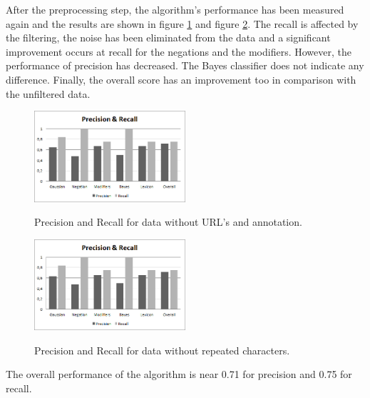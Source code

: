 After the preprocessing step, the algorithm's performance has been measured again and the results are shown in figure \ref{nonannotateddata} and figure \ref{nonmultiplesdata}. The recall is affected by the filtering, the noise has been eliminated from the data and a significant improvement occurs at recall for the negations and the modifiers. However, the performance of precision has decreased. The Bayes classifier does not indicate any difference.  Finally, the overall score has an improvement too in comparison with the unfiltered data.  
\begin{figure}[ht]
\centering
\includegraphics[width=0.5\textwidth]{images/nonannotadeddata.png}
\label{nonannotateddata}
\caption{Precision and Recall for data without URL's and annotation.}
\end{figure}

\begin{figure}[ht]
\centering
\includegraphics[width=0.5\textwidth]{images/eliminatedmultiplesdata.png}
\label{nonmultiplesdata}
\caption{Precision and Recall for data without repeated characters.}
\end{figure}

The overall performance of the algorithm is near 0.71 for precision and 0.75 for recall.